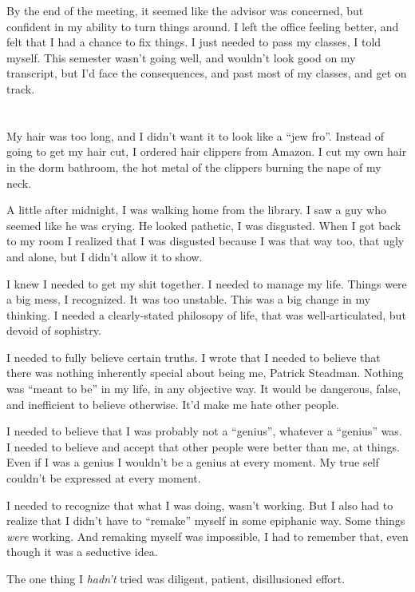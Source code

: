 By the end of the meeting, it seemed like the advisor was concerned, but
confident in my ability to turn things around.  I left the office feeling
better, and felt that I had a chance to fix things.  I just needed to pass my
classes, I told myself.  This semester wasn't going well, and wouldn't look good
on my transcript, but I'd face the consequences, and past most of my classes,
and get on track.

\section{}

My hair was too long, and I didn't want it to look like a ``jew fro''.  Instead of
going to get my hair cut, I ordered hair clippers from Amazon.  I cut my own
hair in the dorm bathroom, the hot metal of the clippers burning the nape of my
neck.  

A little after midnight, I was walking home from the library.  I saw a guy who
seemed like he was crying.  He looked pathetic, I was disgusted.  When I got
back to my room I realized that I was disgusted because I was that way too, that
ugly and alone, but I didn't allow it to show. 

I knew I needed to get my shit together.  I needed to manage my life.  Things
were a big mess, I recognized.  It was too unstable.  This was a big change in
my thinking.  I needed a clearly-stated philosopy of life, that was
well-articulated, but devoid of sophistry.

I needed to fully believe certain truths.  I wrote that I needed to believe that
there was nothing inherently special about being me, Patrick Steadman.  Nothing
was ``meant to be'' in my life, in any objective way.  It would be dangerous,
false, and inefficient to believe otherwise.  It'd make me hate other people.

I needed to believe that I was probably not a ``genius'', whatever a ``genius''
was.  I needed to believe and accept that other people were better than me, at
things.  Even if I was a genius I wouldn't be a genius at every moment.  My true
self couldn't be expressed at every moment.  

I needed to recognize that what I was doing, wasn't working.  But I also had to
realize that I didn't have to ``remake'' myself in some epiphanic way.  Some
things \textit{were} working.  And remaking myself was impossible, I had to
remember that, even though it was a seductive idea. 

The one thing I \textit{hadn't} tried was diligent, patient, disillusioned
effort.

